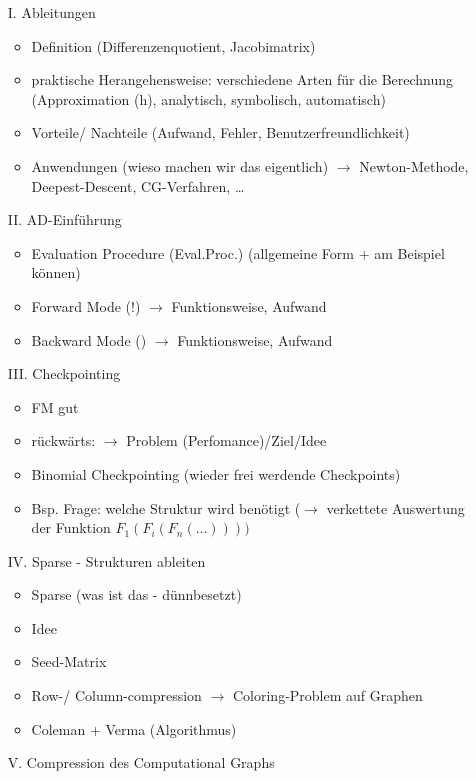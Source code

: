 \begin{itemize}
	\item[I.] Ableitungen
	\begin{itemize}
		\item Definition (Differenzenquotient, Jacobimatrix)
		\item praktische Herangehensweise: verschiedene Arten für die Berechnung (Approximation (h), analytisch, symbolisch, automatisch)
		\item Vorteile/ Nachteile (Aufwand, Fehler, Benutzerfreundlichkeit)
		\item Anwendungen (wieso machen wir das eigentlich) $\rightarrow$ Newton-Methode, Deepest-Descent, CG-Verfahren, \dots
	\end{itemize}
	\item[II.] AD-Einführung
	\begin{itemize}
		\item Evaluation Procedure (Eval.Proc.) (allgemeine Form + am Beispiel können)
		\item Forward Mode (!) $\rightarrow$ Funktionsweise, Aufwand
		\item Backward Mode () $\rightarrow$ Funktionsweise, Aufwand
	\end{itemize}
	\item[III.] Checkpointing
	\begin{itemize}
		\item FM gut
		\item rückwärts: $\rightarrow$ Problem (Perfomance)/Ziel/Idee
		\item Binomial Checkpointing (wieder frei werdende Checkpoints)
		\item Bsp. Frage: welche Struktur wird benötigt ($\rightarrow$ verkettete Auswertung der Funktion $F_1( F_i(F_n( \dots))))$
	\end{itemize}
	\item[IV.] Sparse - Strukturen ableiten
	\begin{itemize}
		\item Sparse (was ist das - dünnbesetzt)
		\item Idee
		\item Seed-Matrix
		\item Row-/ Column-compression $\rightarrow$ Coloring-Problem auf Graphen
		\item Coleman + Verma (Algorithmus)
	\end{itemize}
	\item[V.] Compression des Computational Graphs
	\begin{itemize}

\end{itemize}
\end{itemize}
